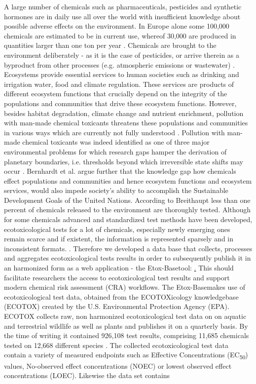 \documentclass[english]{article}
\newcommand{\etoxbase}{Etox-Base}
\newcommand{\ecfifty}{EC\textsubscript{50}}
\begin{document}
A large number of chemicals such as pharmaceuticals, pesticides and synthetic hormones are in daily use all over the world with insufficient knowledge about possible adverse effects on the environment. In Europe alone some 100,000 chemicals are estimated to be in current use, whereof 30,000 are produced in quantities larger than one ton per year \citep{breithaupt_costs_2006}. Chemicals are brought to the environment deliberately - as it is the case of pesticides, or arrive therein as a byproduct from other processes (e.g. atmospheric emissions or wastewater) \citep{schwarzenbach_challenge_2006}. Ecosystems provide essential services to human societies such as drinking and irrigation water, food and climate regulation. These services are products of different ecosystem functions that crucially depend on the integrity of the populations and communities that drive these ecosystem functions. However, besides habitat degradation, climate change and nutrient enrichment, pollution with man-made chemical toxicants threatens these populations and communities in various ways which are currently not fully understood \citep{steffen_anthropocene_2007}. Pollution with man-made chemical toxicants was indeed identified as one of three major environmental problems for which research gaps hamper the derivation of planetary boundaries, i.e. thresholds beyond which irreversible state shifts may occur \citep{steffen_anthropocene_2007}. Bernhardt et al. \citet{bernhardt_synthetic_2017} argue further that the knowledge gap how chemicals effect populations and communities and hence ecosystem functions and ecosystem services, would also impede society’s ability to accomplish the Sustainable Development Goals of the United Nations. According to Breithaupt \citet{breithaupt_costs_2006} less than one percent of chemicals released to the environment are thoroughly tested. Although for some chemicals advanced and standardized \citep{oecd_oecd_2018} test methods have been developed, ecotoxicological tests for a lot of chemicals, especially newly emerging ones remain scarce and if existent, the information is represented sparsely and in inconsistent formats. \citep{gessner_fostering_2016}. Therefore we developed a data base that collects, processes and aggregates ecotoxicological tests results in order to subsequently publish it in an harmonized form as a web application - the \etoxbase tool: \href{http://139.14.20.252:3838/etox-base-shiny/}. This should facilitate researchers the access to ecotoxicological test results and support modern chemical risk assessment (CRA) workflows. The \etoxbase makes use of ecotoxicological test data, obtained from the ECOTOXicology knowledgebase (ECOTOX) created by the U.S. Environmental Protection Agency (EPA). ECOTOX collects raw, non harmonized ecotoxicological test data on on aquatic and terrestrial wildlife as well as plants and publishes it on a quarterly basis. By the time of writing it contained 926,108 test results, comprising 11,685 chemicals tested on 12,668 different species \citep{elonen_ecotoxicology_2018}. The collected ecotoxicological test data contain a variety of measured endpoints such as Effective Concentrations (\ecfifty{}) values, No-observed effect concentrations (NOEC) or lowest observed effect concentrations (LOEC). Likewise the data set contains 
\end{document}
